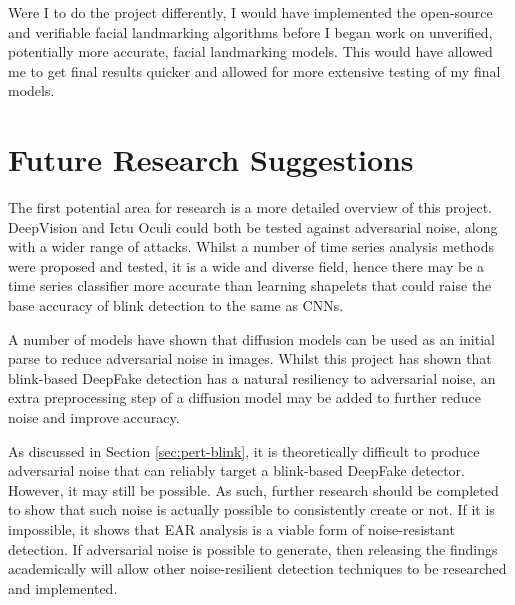 Were I to do the project differently, I would have implemented the open-source and verifiable facial landmarking algorithms before I began work on unverified, potentially more accurate, facial landmarking models. This would have allowed me to get final results quicker and allowed for more extensive testing of my final models. 

\section{Future Research Suggestions}


The first potential area for research is a more detailed overview of this project. DeepVision and Ictu Oculi could both be tested against adversarial noise, along with a wider range of attacks. Whilst a number of time series analysis methods were proposed and tested, it is a wide and diverse field, hence there may be a time series classifier more accurate than learning shapelets that could raise the base accuracy of blink detection to the same as CNNs.

A number of models have shown that diffusion models can be used as an initial parse to reduce adversarial noise in images\cite{nie2022diffusion}\cite{croitoru2023diffusion}\cite{ankile2023denoising}. Whilst this project has shown that blink-based DeepFake detection has a natural resiliency to adversarial noise, an extra preprocessing step of a diffusion model may be added to further reduce noise and improve accuracy.

As discussed in Section \ref{sec:pert-blink}, it is theoretically difficult to produce adversarial noise that can reliably target a blink-based DeepFake detector. However, it may still be possible. As such, further research should be completed to show that such noise is actually possible to consistently create or not. If it is impossible, it shows that EAR analysis is a viable form of noise-resistant detection. If adversarial noise is possible to generate, then releasing the findings academically will allow other noise-resilient detection techniques to be researched and implemented.

